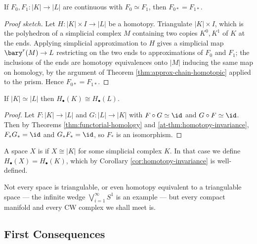 \begin{theorem} \label{at-thm:homotopy-invariance}
	If $F_0, F_1: |K|\to|L|$ are continuous with $F_0 \simeq F_1$, then $F_{0*} = F_{1*}$.
\end{theorem}
\begin{proof}[Proof sketch]
	Let $H: |K|\times I \to |L|$ be a homotopy. Triangulate $|K|\times I$, which is the polyhedron of a simplicial complex $M$ containing two copies $K^0, K^1$ of $K$ at the ends. Applying simplicial approximation to $H$ gives a simplicial map $\bary^r(M)\to L$ restricting on the two ends to approximations of $F_0$ and $F_1$; the inclusions of the ends are homotopy equivalences onto $|M|$ inducing the same map on homology, by the argument of Theorem \ref{thm:approx-chain-homotopic} applied to the prism. Hence $F_{0*} = F_{1*}$.
\end{proof}

\begin{corollary} \label{cor:homotopy-invariance}
	If $|K| \simeq |L|$ then $H_\bullet(K)\cong H_\bullet(L)$.
\end{corollary}
\begin{proof}
	Let $F: |K|\to|L|$ and $G: |L|\to|K|$ with $F\circ G \simeq \id$ and $G \circ F \simeq \id$. Then by Theorems \ref{thm:functorial-homology} and \ref{at-thm:homotopy-invariance}, $F_*G_* = \id$ and $G_*F_* = \id$, so $F_*$ is an isomorphism.
\end{proof}

\begin{definition}
	A space $X$ is  if $X \cong |K|$ for some simplicial complex $K$. In that case we define $H_\bullet(X) = H_\bullet(K)$, which by Corollary \ref{cor:homotopy-invariance} is well-defined.
\end{definition}

Not every space is triangulable, or even homotopy equivalent to a triangulable space --- the
infinite wedge $\bigvee_{i=1}^\infty S^1$ is an example --- but every compact manifold and
every CW complex we shall meet is.

\subsection{First Consequences}

